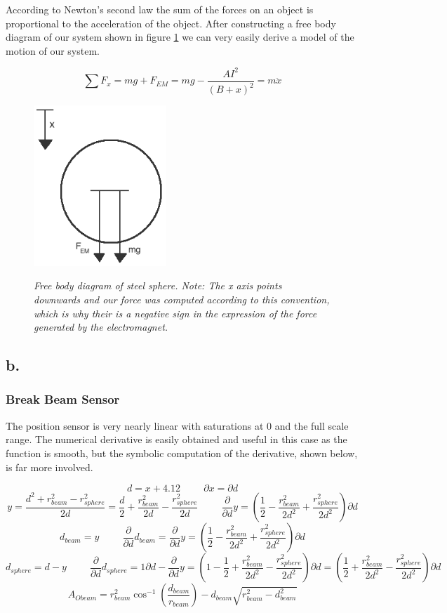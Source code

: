 \documentclass{article}
\theoremstyle{plain}
\theoremstyle{definition}
\theoremstyle{remark}
\begin{document}
According to Newton's second law the sum of the forces on an object is proportional to the acceleration of the object.  After constructing a free body diagram of our system shown in figure \ref{Q1_a4} we can very easily derive a model of the motion of our system.

$$ \sum F_x = mg + F_{EM} = mg -\frac{A I^2}{(B+x)^2} = m  \ddot{x}$$

\begin{figure}
\begin{center}
\includegraphics[width = 5cm]{freebodydiagram.png}
\label{Q1_a4}
\caption{\emph{Free body diagram of steel sphere.  Note: The x axis points downwards and our force was computed according to this convention, which is why their is a negative sign in the expression of the force generated by the electromagnet.}}
\end{center}
\end{figure}

\subsection*{b.}
\subsubsection*{Break Beam Sensor}
The position sensor is very nearly linear with saturations at 0 and the full scale range.  The numerical derivative is easily obtained and useful in this case as the function is smooth, but the symbolic computation of the derivative, shown below, is far more involved. 

$$ d = x + 4.12 \hspace{1cm} \partial x=\partial d $$
$$ y = \frac{d^2+r_{beam}^2-r_{sphere}^2}{2d}=\frac{d}{2} + \frac{r_{beam}^2}{2d} - \frac{r_{sphere}^2}{2d} \hspace{1cm} \frac{\partial}{\partial d} y = \left(\frac{1}{2}  -\frac{r_{beam}^2}{2d^2} + \frac{r_{sphere}^2}{2d^2}\right) \partial d $$
$$ d_{beam}=y \hspace{1cm} \frac{\partial}{\partial d} d_{beam} =  \frac{\partial}{\partial d} y = \left(\frac{1}{2}  -\frac{r_{beam}^2}{2d^2} + \frac{r_{sphere}^2}{2d^2}\right) \partial d $$
$$  d_{sphere}=d-y \hspace{1cm}   \frac{\partial}{\partial d} d_{sphere} = 1\partial d - \frac{\partial}{\partial d} y = \left(1 - \frac{1}{2}  +\frac{r_{beam}^2}{2d^2} - \frac{r_{sphere}^2}{2d^2}\right) \partial d = \left(\frac{1}{2}  +\frac{r_{beam}^2}{2d^2} - \frac{r_{sphere}^2}{2d^2}\right) \partial d$$
$$ A_{Obeam} = r_{beam}^2 \cos^{-1} (\frac{d_{beam}}{r_{beam}})-d_{beam} \sqrt{r_{beam}^2-d_{beam}^2}$$ 
\end{document}
